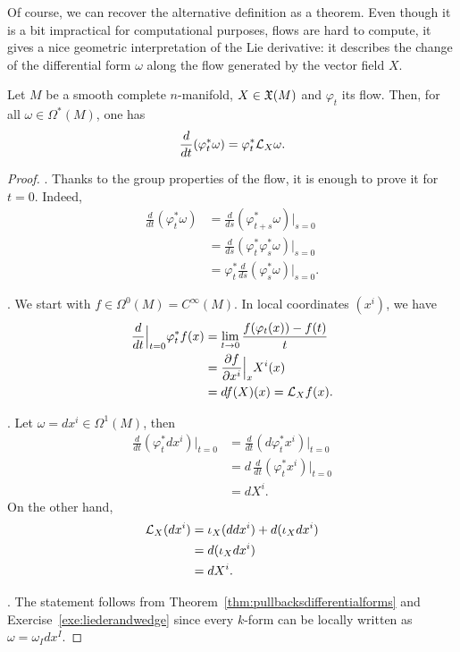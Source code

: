 Of course, we can recover the alternative definition as a theorem.
Even though it is a bit impractical for computational purposes, flows are hard to compute, it gives a nice geometric interpretation of the Lie derivative: it describes the change of the differential form $\omega$ along the flow generated by the vector field $X$.

\begin{theorem}\label{thm:LieDerivativeFlow}
  Let $M$ be a smooth complete $n$-manifold, $X\in\mathfrak{X}(M)$ and $\varphi_t$ its flow.
  Then, for all $\omega\in \Omega^*(M)$, one has
  \begin{equation}
    \frac{d}{dt}(\varphi_t^* \omega) = \varphi_t^*\mathcal{L}_X\omega.
  \end{equation}
\end{theorem}
\begin{proof}
  .
  Thanks to the group properties of the flow, it is enough to prove it for $t=0$.
  Indeed,
  \begin{align}
    \frac{d}{dt}(\varphi_t^* \omega)
    &= \frac{d}{ds}(\varphi_{t+s}^* \omega)\Big|_{s=0} \\
    &= \frac{d}{ds}(\varphi_t^*\varphi_s^*\omega)\Big|_{s=0} \\
    &= \varphi^*_t \frac{d}{ds}(\varphi_s^*\omega)\Big|_{s=0}.
  \end{align}

  .
  We start with $f\in\Omega^0(M) = C^\infty(M)$.
  In local coordinates $(x^i)$, we have
  \begin{align}
    \frac{d}{dt}\Big|_{t=0}\varphi_t^* f(x) 
    &= \lim_{t\to0} \frac{f(\varphi_t(x)) - f(t)}{t} \\
    &= \frac{\partial f}{\partial x^i}\Big|_x X^i(x) \\
    &= df(X)(x) = \mathcal{L}_X f(x).
  \end{align} 

  . Let $\omega = dx^i \in \Omega^1(M)$, then
  \begin{align}
    \frac{d}{dt}(\varphi_t^* dx^i)\Big|_{t=0}
    &= \frac{d}{dt}(d\varphi_t^* x^i)\Big|_{t=0} \\
    &= d\, \frac{d}{dt}(\varphi_t^* x^i)\Big|_{t=0} \\
    &= dX^i.
  \end{align}
  On the other hand,
  \begin{align}
    \mathcal{L}_X(dx^i)
    &= \iota_X(ddx^i) + d(\iota_X dx^i)\\
    &= d(\iota_X dx^i) \\
    &= dX^i.
  \end{align}

  . The statement follows from Theorem~\ref{thm:pullbacksdifferentialforms} and Exercise~\ref{exe:liederandwedge} since every $k$-form can be locally written as $\omega = \omega_I dx^I$.
\end{proof}

